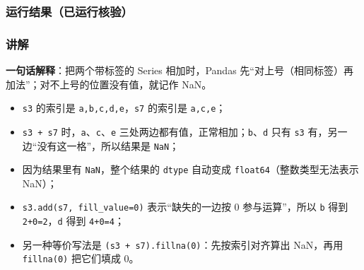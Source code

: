 \subsubsection{运行结果（已运行核验）}\label{ux8fd0ux884cux7ed3ux679cux5df2ux8fd0ux884cux6838ux9a8c-17}

\begin{Shaded}
\begin{Highlighting}[]
\end{Highlighting}
\end{Shaded}

\subsubsection{讲解}\label{ux8bb2ux89e3-17}

\textbf{一句话解释}：把两个带标签的 Series 相加时，Pandas
先``对上号（相同标签）再加法''；对不上号的位置没有值，就记作 NaN。

\begin{itemize}
\tightlist
\item
  \texttt{s3} 的索引是 \texttt{a,b,c,d,e}，\texttt{s7} 的索引是
  \texttt{a,c,e}；
\item
  \texttt{s3\ +\ s7} 时，\texttt{a}、\texttt{c}、\texttt{e}
  三处两边都有值，正常相加；\texttt{b}、\texttt{d} 只有 \texttt{s3}
  有，另一边``没有这一格''，所以结果是 \texttt{NaN}；
\item
  因为结果里有 \texttt{NaN}，整个结果的 \texttt{dtype} 自动变成
  \texttt{float64}（整数类型无法表示 NaN）；
\item
  \texttt{s3.add(s7,\ fill\_value=0)} 表示``缺失的一边按 0
  参与运算''，所以 \texttt{b} 得到 \texttt{2+0=2}，\texttt{d} 得到
  \texttt{4+0=4}；
\item
  另一种等价写法是 \texttt{(s3\ +\ s7).fillna(0)}：先按索引对齐算出
  NaN，再用 \texttt{fillna(0)} 把它们填成 0。
\end{itemize}

